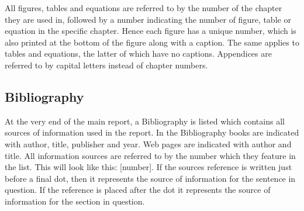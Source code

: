 All figures, tables and equations are referred to by the number of the chapter they are used in, followed by a number indicating the number of figure, table or equation in the specific chapter. Hence each figure has a unique number, which is also printed at the bottom of the figure along with a caption. The same applies to tables and equations, the latter of which have no captions. Appendices are referred to by capital letters instead of chapter numbers.

\subsection*{Bibliography} At the very end of the main report, a Bibliography is listed which contains all sources of information used in the report. In the Bibliography books are indicated with author, title, publisher and year. Web pages are indicated with author and title. All information sources are referred to by the number which they feature in the list. This will look like this: [number]. If the sources reference is written just before a final dot, then it represents the source of information for the sentence in question. If the reference is placed after the dot it represents the source of information for the section in question. 

